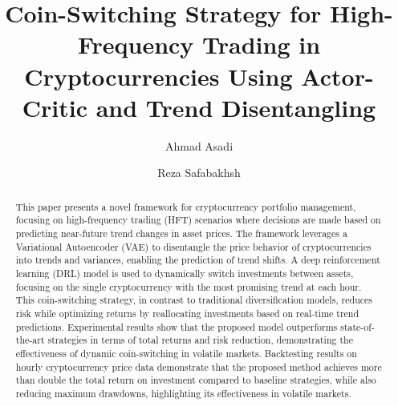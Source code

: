 \documentclass[preprint,review,12pt]{elsarticle}
\begin{document}
\begin{frontmatter}

\title{Coin-Switching Strategy for High-Frequency Trading in Cryptocurrencies Using Actor-Critic and Trend Disentangling}

\author{Ahmad Asadi}%
\author{Reza Safabakhsh}




\address{Deep Learning Lab, Computer Engineering Department}
\address{Amirkabir University of Technology, Tehran, Iran.}

\begin{abstract}
This paper presents a novel framework for cryptocurrency portfolio management, focusing on high-frequency trading (HFT) scenarios where decisions are made based on predicting near-future trend changes in asset prices. The framework leverages a Variational Autoencoder (VAE) to disentangle the price behavior of cryptocurrencies into trends and variances, enabling the prediction of trend shifts. A deep reinforcement learning (DRL) model is used to dynamically switch investments between assets, focusing on the single cryptocurrency with the most promising trend at each hour. This coin-switching strategy, in contrast to traditional diversification models, reduces risk while optimizing returns by reallocating investments based on real-time trend predictions. Experimental results show that the proposed model outperforms state-of-the-art strategies in terms of total returns and risk reduction, demonstrating the effectiveness of dynamic coin-switching in volatile markets. Backtesting results on hourly cryptocurrency price data demonstrate that the proposed method achieves more than double the total return on investment compared to baseline strategies, while also reducing maximum drawdowns, highlighting its effectiveness in volatile markets.
\end{abstract}



\end{frontmatter}
\end{document}
